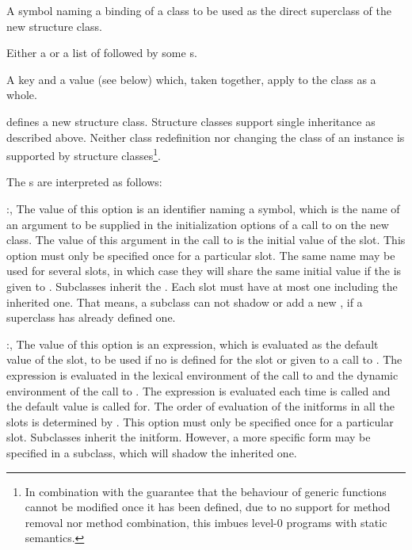 \begin{optDefinition}
\begin{arguments}
    \item[\scref{superclass-name}] A symbol naming a binding of a class to be
    used as the direct superclass of the new structure class.

    \item[\scref{slot}] Either a  or a list of
     followed by some s.

    \item[\scref{class-option}] A key and a value (see below) which, taken
    together, apply to the class as a whole.
\end{arguments}
%
\remarks%
 defines a new structure class. Structure classes support
single inheritance as described above. Neither class redefinition nor changing
the class of an instance is supported by structure classes\footnote{In
    combination with the guarantee that the behaviour of generic functions
    cannot be modified once it has been defined, due to no support for method
    removal nor method combination, this imbues level-0 programs with static
    semantics.}.

The s are interpreted as follows:
\begin{options}
    \item[\keyworddef{keyword}:, \scref{identifier}]%
    The value of this option is an identifier naming a symbol, which is the name
    of an argument to be supplied in the initialization options of a call to
     on the new class.  The value of this argument in the call
    to  is the initial value of the slot.  This option must
    only be specified once for a particular slot.  The same  name
    may be used for several slots, in which case they will share the same
    initial value if the  is given to .
    Subclasses inherit the . Each slot must have at most one
     including the inherited one. That means, a subclass can not
    shadow or add a new , if a superclass has already defined
    one.

    \item[\keyworddef{default}:, \scref{level-0-expression}]%
    The value of this option is an expression, which is evaluated as the default
    value of the slot, to be used if no  is defined for the slot
    or given to a call to .  The expression is evaluated in
    the lexical environment of the call to  and the dynamic
    environment of the call to .  The expression is evaluated
    each time  is called and the default value is called for.
    The order of evaluation of the initforms in all the slots is determined by
    .  This option must only be specified once for a
    particular slot. Subclasses inherit the initform.  However, a more specific
    form may be specified in a subclass, which will shadow the inherited one.


\end{options}
\end{optDefinition}
